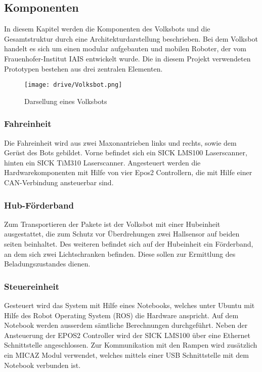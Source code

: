 \subsection{Komponenten}

In diesem Kapitel werden die Komponenten des Volksbots und die Gesamtstruktur  durch eine Architekturdarstellung beschrieben. Bei dem Volksbot handelt es sich um einen modular aufgebauten und mobilen Roboter, der vom Frauenhofer-Institut IAIS entwickelt wurde. Die in diesem Projekt verwendeten Prototypen bestehen aus drei zentralen Elementen. 

	\begin{figure}[h!]
		\centering
			\texttt{[image: drive/Volksbot.png]}
			\caption{Darsellung eines Volksbots}
			\label{Volksbot}
	\end{figure}	




\subsubsection{Fahreinheit}

Die Fahreinheit wird aus zwei Maxonantrieben links und rechts, sowie dem Gerüst des Bots gebildet. Vorne befindet sich ein SICK LMS100 Laserscanner,  hinten ein SICK TiM310 Laserscanner. Angesteuert werden die Hardwarekomponenten mit Hilfe von vier Epos2 Controllern, die mit Hilfe einer CAN-Verbindung ansteuerbar sind. 

\subsubsection{Hub-Förderband}

Zum Transportieren der Pakete ist der Volksbot mit einer Hubeinheit ausgestattet, die zum Schutz vor Überdrehungen zwei Hallsensor auf beiden seiten beinhaltet. Des weiteren befindet sich auf der Hubeinheit ein Förderband, an dem sich zwei Lichtschranken befinden. Diese sollen zur Ermittlung des Beladungszustandes dienen. 

\subsubsection{Steuereinheit}

Gesteuert wird das System mit Hilfe eines Notebooks, welches unter Ubuntu mit Hilfe des Robot Operating System (ROS) die Hardware anspricht. Auf dem Notebook werden ausserdem sämtliche 
Berechnungen durchgeführt. Neben der Ansteuerung der EPOS2 Controller wird der SICK LMS100 über eine Ethernet Schnittstelle angeschlossen. Zur Kommunikation mit den Rampen wird zusätzlich ein MICAZ Modul verwendet, welches mittels einer USB Schnittstelle mit dem Notebook verbunden ist.

